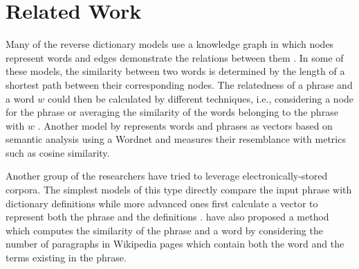 \documentclass{article}
\begin{document}
\section{Related Work \label{sec:rel-work}}
Many of the reverse dictionary models use a knowledge graph in which nodes represent words and edges demonstrate the relations between them \citep{ferret2006enhancing}. In some of these models, the similarity between two words is determined by the length of a shortest path between their corresponding nodes. The relatedness of a phrase and a word $w$ could then be calculated by different techniques, i.e., considering a node for the phrase \citep{dutoit2002lexical} or averaging the similarity of the words belonging to the phrase with $w$ \citep{thorat2016implementing}. Another model by \citet{mendez2013reverse} represents words and phrases as vectors based on semantic analysis using a Wordnet \citep{miller1995wordnet} and measures their resemblance with metrics such as cosine similarity.

Another group of the researchers have tried to leverage electronically-stored corpora. The simplest models of this type directly compare the input phrase with dictionary definitions \citep{el2004use,shaw2011building} while more advanced ones first calculate a vector to represent both the phrase and the definitions \citep{bilac2004dictionary}. \citet{zock2004word} have also proposed a method which computes the similarity of the phrase and a word by considering the number of paragraphs in Wikipedia pages which contain both the word and the terms existing in the phrase.
\end{document}
